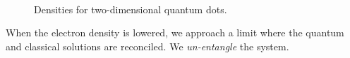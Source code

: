 \documentclass[
paper=128mm:96mm, %
fontsize=11pt, %
pagesize, %
parskip=half-, %
]{scrartcl} %
\theoremstyle{mythmstyle} %
\begin{document}
\begin{figure}
\begin{center}
   \\
  \caption{\scriptsize{Densities for two-dimensional quantum dots.}}
  \label{fig:OBD_DMC_QDOTS_w1} 
 \end{center}
\end{figure}
\clearpage


When the electron density is lowered, we approach a limit where the quantum and classical solutions are reconciled. We \textit{un-entangle} the system.

\clearpage

\end{document}
